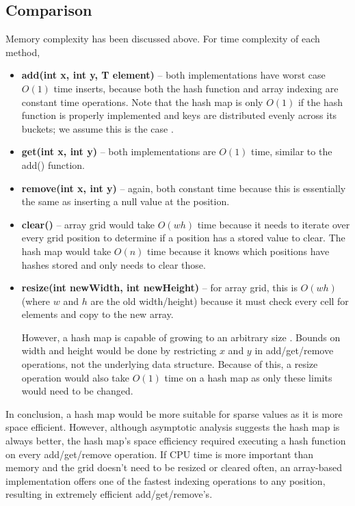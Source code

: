 \documentclass[11pt,a4paper]{article} %
\begin{document}
\subsection*{Comparison}
Memory complexity has been discussed above. For time complexity of 
each method, 
\begin{itemize}
    \item \textbf{add(int x, int y, T element)} -- both implementations 
    have worst case $O(1)$ time inserts, because both the hash function and array indexing 
    are constant time operations. Note that the hash map is only $O(1)$ if the hash 
    function is properly implemented and keys are distributed evenly across its 
    buckets; we assume this is the case \cite{demaine_indyk_kellis_2011}.
    \item \textbf{get(int x, int y)} -- both implementations 
    are $O(1)$ time, similar to the add() function.
    \item \textbf{remove(int x, int y)} -- again, both constant time because this is essentially 
    the same as inserting a null value at the position.
    \item \textbf{clear()} -- array grid would take $O(wh)$ time because 
    it needs to iterate over every grid position to determine if 
    a position has a stored value to clear. The hash map would take 
    $O(n)$ time because it knows which positions have hashes stored
    and only needs to clear those.
    \item \textbf{resize(int newWidth, int newHeight)} -- 
    for array grid, this is $O(wh)$ (where $w$ and $h$ are the old width/height) 
    because it must check every cell for elements and copy to the new array.
    
    However, a hash map is capable of growing to an arbitrary size \cite{hashmap}. 
    Bounds on width and height would be done by restricting $x$ and $y$ in add/get/remove operations, 
    not the underlying data structure. Because of this, a resize operation would also take $O(1)$ time 
    on a hash map as only these limits would need to be changed.
\end{itemize}

In conclusion, a hash map would be more suitable for sparse values as it is more space efficient. 
However, although asymptotic analysis suggests the hash map is always better, 
the hash map's space efficiency required executing a hash function on every add/get/remove operation. 
If CPU time is more important than memory and the grid doesn't need to be resized or cleared often, 
an array-based implementation offers one of the fastest indexing operations to any position, 
resulting in extremely efficient add/get/remove's.

 

\end{document}
